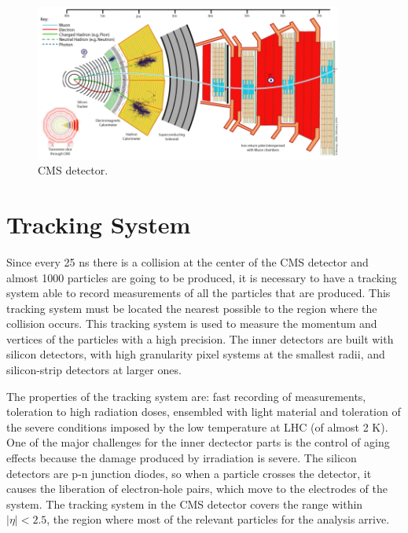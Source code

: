

 \begin{figure}[h] \label{CMS_detector}
 \centering
 \caption{CMS detector.}
 \includegraphics[width=0.9\textwidth]{./Capitulos/CMS/CMS}  
 \end{figure}

\section{Tracking System}

Since every 25 ns there is a collision at the center of the CMS detector and almost 1000 particles are going to be produced, it is necessary to have a tracking system able to record measurements 
of all the particles that are produced. This tracking system must be located the nearest possible to the region where the collision occurs. This tracking system is used to measure the momentum and 
vertices of the particles with a high precision. The inner detectors are built with silicon detectors, with high granularity pixel systems at the smallest radii, and silicon-strip detectors at 
larger ones. 


The properties of the tracking system are: fast recording of measurements, toleration to high radiation doses, ensembled with light material and toleration of the severe conditions imposed by the low temperature at LHC (of almost 2 K). One of the major challenges for the inner dectector parts is the control of aging effects because the damage produced by irradiation is severe. The silicon detectors are p-n junction diodes, so when a particle crosses the detector, it causes the liberation of electron-hole pairs, which move to the electrodes of the system. The tracking system in the CMS detector covers the range within $|\eta|<2.5$, the region where most of the relevant particles for the analysis arrive. 

